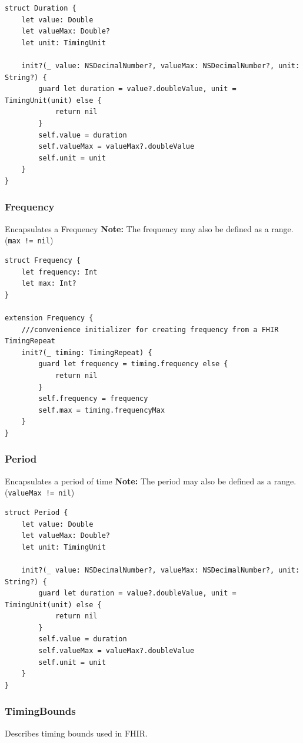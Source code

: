 \documentclass{article}
\begin{document}
\begin{verbatim}
struct Duration {
    let value: Double
    let valueMax: Double?
    let unit: TimingUnit

    init?(_ value: NSDecimalNumber?, valueMax: NSDecimalNumber?, unit: String?) {
        guard let duration = value?.doubleValue, unit = TimingUnit(unit) else {
            return nil
        }
        self.value = duration
        self.valueMax = valueMax?.doubleValue
        self.unit = unit
    }
}
\end{verbatim}

\subsubsection{Frequency}\label{frequency}
Encapsulates a Frequency \textbf{Note:} The frequency may
also be defined as a range. (\texttt{max\ !=\ nil})

\begin{verbatim}
struct Frequency {
    let frequency: Int
    let max: Int?
}

extension Frequency {
    ///convenience initializer for creating frequency from a FHIR TimingRepeat
    init?(_ timing: TimingRepeat) {
        guard let frequency = timing.frequency else {
            return nil
        }
        self.frequency = frequency
        self.max = timing.frequencyMax
    }
}
\end{verbatim}

\subsubsection{Period}\label{period}
Encapsulates a period of time \textbf{Note:} The period
may also be defined as a range. (\texttt{valueMax\ !=\ nil})

\begin{verbatim}
struct Period {
    let value: Double
    let valueMax: Double?
    let unit: TimingUnit

    init?(_ value: NSDecimalNumber?, valueMax: NSDecimalNumber?, unit: String?) {
        guard let duration = value?.doubleValue, unit = TimingUnit(unit) else {
            return nil
        }
        self.value = duration
        self.valueMax = valueMax?.doubleValue
        self.unit = unit
    }
}
\end{verbatim}

\subsubsection{TimingBounds}\label{timingbounds}
Describes timing bounds used in FHIR.
\end{document}
